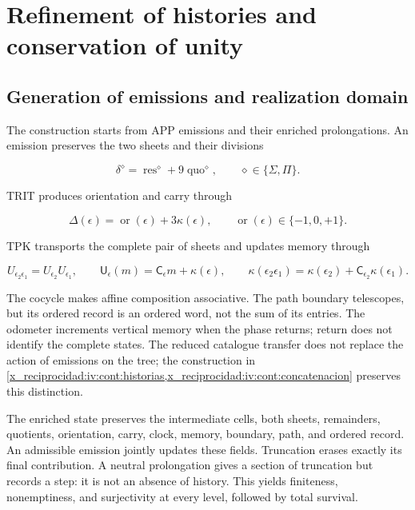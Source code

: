 \chapter{Refinement of histories and conservation of unity}
\label{x_reciprocidad:nuclear:1}
\section{Generation of emissions and realization domain}

The construction starts from APP emissions and their enriched prolongations. An emission preserves the two sheets and their divisions

\[
\delta^\diamond=\operatorname{res}^\diamond+9\operatorname{quo}^\diamond,
\qquad \diamond\in\{\Sigma,\Pi\}.
\]

TRIT produces orientation and carry through

\[
\Delta(\epsilon)=\operatorname{or}(\epsilon)+3\kappa(\epsilon),
\qquad \operatorname{or}(\epsilon)\in\{-1,0,+1\}.
\]

TPK transports the complete pair of sheets and updates memory through

\[
U_{\epsilon_2\epsilon_1}=U_{\epsilon_2}U_{\epsilon_1},\qquad
\mathsf U_\epsilon(m)=\mathsf C_\epsilon m+\kappa(\epsilon),\qquad
\kappa(\epsilon_2\epsilon_1)
=\kappa(\epsilon_2)+\mathsf C_{\epsilon_2}\kappa(\epsilon_1).
\]

The cocycle makes affine composition associative. The path boundary telescopes, but its ordered record is an ordered word, not the sum of its entries. The odometer increments vertical memory when the phase returns; return does not identify the complete states. The reduced catalogue transfer does not replace the action of emissions on the tree; the construction in \cref{x_reciprocidad:iv:cont:historias,x_reciprocidad:iv:cont:concatenacion} preserves this distinction.

The enriched state preserves the intermediate cells, both sheets, remainders, quotients, orientation, carry, clock, memory, boundary, path, and ordered record. An admissible emission jointly updates these fields. Truncation erases exactly its final contribution. A neutral prolongation gives a section of truncation but records a step: it is not an absence of history. This yields finiteness, nonemptiness, and surjectivity at every level, followed by total survival.

